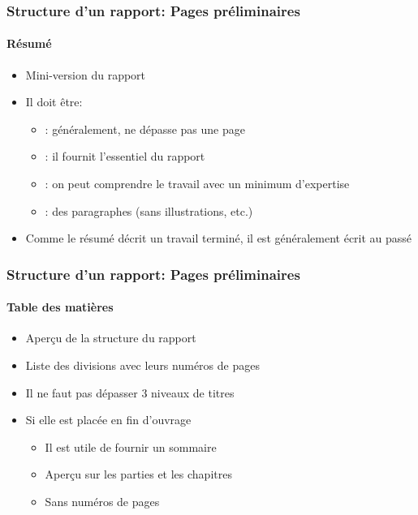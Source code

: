 \documentclass[xcolor=table]{beamer}
\begin{document}
\begin{frame}
\frametitle{Structure d'un rapport: Pages préliminaires}
\framesubtitle{Résumé}

\begin{minipage}{0.60\textwidth}
	\begin{itemize}
		\item Mini-version du rapport
		\item Il doit être:
		\begin{itemize}
			\item {}: généralement, ne dépasse pas une page
			\item {}: il fournit l'essentiel du rapport
			\item {}: on peut comprendre le travail avec un minimum d'expertise
			\item {}: des paragraphes (sans illustrations, etc.)
		\end{itemize}
		\item Comme le résumé décrit un travail terminé, il est généralement écrit au passé
	\end{itemize}
\end{minipage}
\begin{minipage}{0.38\textwidth}
\end{minipage}

\end{frame}

\begin{frame}
\frametitle{Structure d'un rapport: Pages préliminaires}
\framesubtitle{Table des matières}

\begin{minipage}{0.60\textwidth}
	\begin{itemize}
		\item Aperçu de la structure du rapport
		\item Liste des divisions avec leurs numéros de pages 
		\item Il ne faut pas dépasser 3 niveaux de titres
		\item Si elle est placée en fin d'ouvrage
		\begin{itemize}
			\item Il est utile de fournir un sommaire
			\item Aperçu sur les parties et les chapitres
			\item Sans numéros de pages
		\end{itemize}
	\end{itemize}
\end{minipage}
\begin{minipage}{0.38\textwidth}
\end{minipage}

\end{frame}
\end{document}
